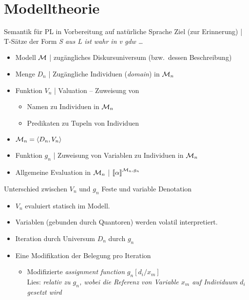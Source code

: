 \section{Modelltheorie}

\begin{frame}
  {Semantik für PL in Vorbereitung auf natürliche Sprache}
  \onslide<+->
  \onslide<+->
  Ziel (zur Erinnerung) | T-Sätze der Form \textit{S aus L ist wahr in v gdw \ldots}\\
  \Halbzeile
  \begin{itemize}[<+->]
    \item \alert{Modell $\mathcal{M}$} | zugängliches Diskursuniversum (bzw.\ dessen Beschreibung)
    \item \alert{Menge $D_n$} | Zugängliche Individuen (\textit{domain}) in $\mathcal{M}_n$
    \item \alert{Funktion $V_n$} | Valuation -- Zuweisung von
      \begin{itemize}[<+->]
        \item Namen zu Individuen in $\mathcal{M}_n$
        \item Predikaten zu Tupeln von Individuen
      \end{itemize}
    \item \alert{$\mathcal{M}_n=\langle{}D_n,V_n\rangle$}
      \Halbzeile
    \item \alert{Funktion $g_n$} | Zuweisung von Variablen zu Individuen in $\mathcal{M}_n$ 
      \Halbzeile
    \item Allgemeine Evaluation in $\mathcal{M}_n$ | ${\llbracket{}\alpha\rrbracket}^{\mathcal{M}_n,g_n}$\\
  \end{itemize}
\end{frame}

\begin{frame}
  {Unterschied zwischen $V_n$ und $g_n$}
  \onslide<+->
  \onslide<+->
  Feste und variable Denotation\\
  \Halbzeile
  \begin{itemize}[<+->]
    \item $V_n$ evaluiert \alert{statisch} im Modell.\\
      \Halbzeile
    \item Variablen (gebunden durch Quantoren) werden \alert{volatil interpretiert}.\\
    \item \alert{Iteration} durch Universum $D_n$ durch $g_n$
    \item Eine Modifikation der Belegung pro Iteration
      \begin{itemize}[<+->]
        \item Modifizierte \textit{assignment function} \alert{$g_n[d_i/x_m]$}\\
          Lies: \textit{relativ zu $g_n$, wobei die Referenz von Variable $x_m$ auf Individuum $d_i$ gesetzt wird}
      \end{itemize}
  \end{itemize}
\end{frame}

